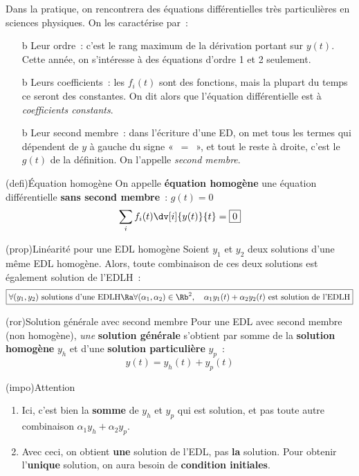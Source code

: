 \documentclass[a4paper, 11pt, garamond]{book}
\begin{document}
Dans la pratique, on rencontrera des équations différentielles très
particulières en sciences physiques. On les caractérise par~:
\begin{itemize}
	\item[b]{Leur ordre}~: c'est le rang maximum de la dérivation portant sur
	$y(t)$. Cette année, on s'intéresse à des équations d'ordre 1 et 2 seulement.
	\item[b]{Leurs coefficients}~: les $f_i(t)$ sont des fonctions, mais la plupart
	du temps ce seront des constantes. On dit alors que l'équation différentielle
	est à \textit{coefficients constants}.
	\item[b]{Leur second membre}~: dans l'écriture d'une ED, on met tous les termes
	qui dépendent de $y$ à gauche du signe «~$=$~», et tout le reste à droite,
	c'est le $g(t)$ de la définition. On l'appelle \textit{second membre}.
\end{itemize}

\begin{tcn}(defi){Équation homogène}
	On appelle \textbf{équation homogène} une équation différentielle \textbf{sans
		second membre}~: $g(t) = 0$
	\[
		\sum_{i} f_i(t) \dv[i]{y(t)}{t} = \fbox{0}
	\]
\end{tcn}

\begin{tcb*}[label=prop:lin](prop){Linéarité pour une EDL homogène}
	Soient $y_1$ et $y_2$ deux solutions d'une même EDL homogène. Alors, toute combinaison de ces deux solutions est également
	solution de l'EDLH~:
	\[
		\boxed{
			\forall (y_1,y_2)
			\text{~solutions d'une EDLH}
			\Ra
			\forall (\alpha_1,\alpha_2) \in \Rb^{2},
			\quad \alpha_1 y_1(t) + \alpha_2 y_2(t)
			\text{~est solution de l'EDLH}
		}
	\]
\end{tcb*}

\begin{tcn}(ror){Solution générale avec second membre}
	Pour une EDL avec second membre (non homogène), \textit{une} \textbf{solution
		générale} s'obtient par somme de la \textbf{solution homogène} $y_h$ et d'une
	\textbf{solution particulière} $y_p$~:
	\[
		\boxed{y(t) = y_h(t) + y_p(t)}
	\]
\end{tcn}

\begin{tcn}(impo){Attention}
	\begin{enumerate}
		\item Ici, c'est bien la \textbf{somme} de $y_h$ et $y_p$ qui est solution,
		      et pas toute autre combinaison $\alpha_1 y_h + \alpha_2 y_p$.
		\item Avec ceci, on obtient \textbf{une} solution de l'EDL, pas \textbf{la}
		      solution. Pour obtenir l'\textbf{unique} solution, on aura besoin de
		      \textbf{condition initiales}.
	\end{enumerate}
\end{tcn}
\end{document}
